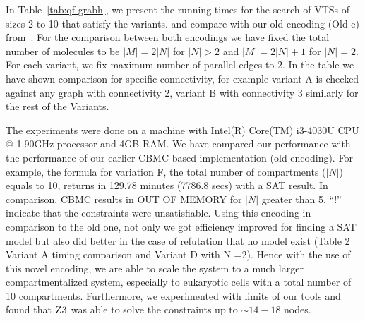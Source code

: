 


In Table~\ref{tab:qf-grabh}, we present the running times for the search of
VTSs of sizes 2 to 10 that satisfy the variants.
and compare with our old encoding
({Old-e}) from~\cite{shukla}.
%
For the comparison between both encodings we have fixed the total
number of molecules to be $|M| = 2|N|$ for $ |N|> 2$ and
$|M| = 2|N| + 1$ for $|N| = 2$.
%
For each variant, we fix maximum number of parallel
edges to 2.
%
In the table we have shown comparison for specific connectivity, for
example variant A is checked against any graph with connectivity 2,
variant B with connectivity 3 similarly for the rest of the Variants.


The experiments were done on a machine with Intel(R) Core(TM) i3-4030U
CPU @ 1.90GHz processor and 4GB RAM.
%
We have compared our performance with the performance of our earlier 
CBMC based implementation (old-encoding).
%
For example, the formula for variation F, the total number of
compartments ($|N|$) equals to 10, returns in 129.78 minutes (7786.8 secs)
with a SAT result.
%
In comparison, CBMC results in OUT OF MEMORY for $|N|$ greater than 5.
%
``!'' indicate that the constraints were unsatisfiable.
%
Using this encoding in comparison to the old one, not only we got efficiency improved for finding a SAT model but also did better in the case of refutation that no model exist (Table 2 Variant A timing comparison and Variant D with N =2). Hence with the use of this novel encoding, we are able to scale the system to a much larger compartmentalized system, especially to
eukaryotic cells with a total number of 10 compartments.
%
%
Furthermore, we experimented with limits of our tools and found
that $\textsc{Z3}$ was able to solve the constraints up to $\sim{14-18}$ nodes.



% 


